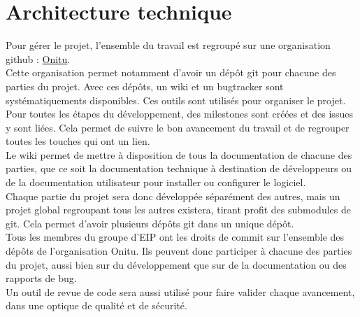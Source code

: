 \section{Architecture technique}

Pour gérer le projet, l'ensemble du travail est regroupé sur une organisation github : \href{https://github.com/onitu/}{Onitu}.\\

Cette organisation permet notamment d'avoir un dépôt git pour chacune des parties du projet. Avec ces dépôts, un wiki et un bugtracker sont systématiquements disponibles. Ces outils sont utilisés pour organiser le projet. Pour toutes les étapes du développement, des milestones sont créées et des issues y sont liées. Cela permet de suivre le bon avancement du travail et de regrouper toutes les touches qui ont un lien.\\

Le wiki permet de mettre à disposition de tous la documentation de chacune des parties, que ce soit la documentation technique à destination de développeurs ou de la documentation utilisateur pour installer ou configurer le logiciel.\\

Chaque partie du projet sera donc développée séparément des autres, mais un projet global regroupant tous les autres existera, tirant profit des submodules de git. Cela permet d'avoir plusieurs dépôts git dans un unique dépôt.\\

Tous les membres du groupe d'EIP ont les droits de commit sur l'ensemble des dépôts de l'organisation Onitu. Ils peuvent donc participer à chacune des parties du projet, aussi bien sur du développement que sur de la documentation ou des rapports de bug.\\

Un outil de revue de code sera aussi utilisé pour faire valider chaque avancement, dans une optique de qualité et de sécurité.
